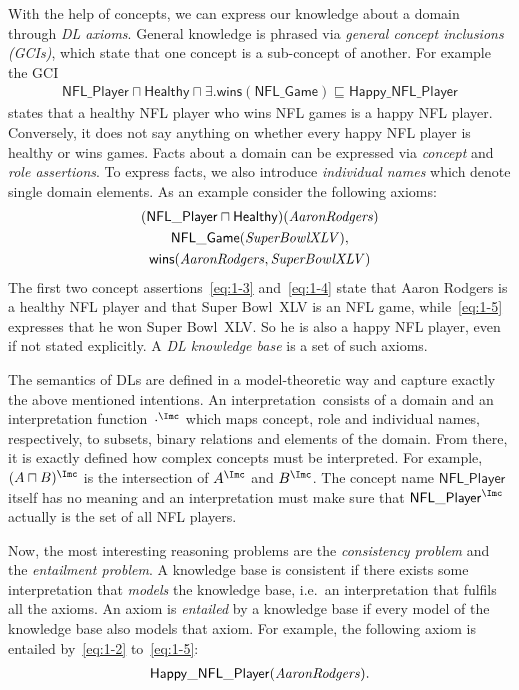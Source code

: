 \documentclass[final]{scrartcl}
\begin{document}
With the help of concepts, we can express our knowledge about a domain through \emph{DL
  axioms}. General knowledge is phrased via \emph{general concept inclusions (GCIs)}, which state
that one concept is a sub-concept of another. For example the GCI
\begin{align}
  \label{eq:1-2}
  \mathsf{NFL\_Player} \sqcap \mathsf{Healthy} \sqcap
  \exists.\mathsf{wins}(\mathsf{NFL\_Game}) \sqsubseteq \mathsf{Happy\_NFL\_Player}
\end{align}
states that a healthy NFL player who wins NFL games is a happy NFL player. Conversely, it does not say
anything on whether every happy NFL player is healthy or wins games. Facts about a domain can be
expressed via \emph{concept} and \emph{role assertions}.  To express facts, we also introduce
\emph{individual names} which denote single domain elements. As an example consider the following axioms:
\begin{gather}
  (\mathsf{NFL\_Player} \sqcap \mathsf{Healthy})(\text{\textit{AaronRodgers}})\label{eq:1-3}\\
  \mathsf{NFL\_Game}(\text{\textit{SuperBowlXLV}}),\label{eq:1-4}\\
  \mathsf{\mathsf{wins}}(\text{\textit{AaronRodgers}},\text{\textit{SuperBowlXLV}})\label{eq:1-5}
\end{gather}
The first two concept assertions~\eqref{eq:1-3} and~\eqref{eq:1-4} state that Aaron Rodgers is a healthy NFL player and that Super Bowl~XLV is
an NFL game, while~\eqref{eq:1-5} expresses that he won Super Bowl~XLV. So he is also a happy
NFL player, even if not stated explicitly.  A \emph{DL knowledge base} is a set of such axioms.

The semantics of DLs are defined in a model-theoretic way and capture exactly the above mentioned
intentions.  An interpretation~\I consists of a domain and an interpretation function~$\cdot^{\I}$
which maps concept, role and individual names, respectively, to subsets, binary relations and elements of the
domain.  From there, it is exactly defined how complex concepts must be
interpreted. For example, $(A\sqcap B)^{\I}$ is the intersection of $A^{\I}$ and $B^{\I}$.  The
concept name $\mathsf{NFL\_Player}$ itself has no meaning and an interpretation must make sure that
$\mathsf{NFL\_Player}^{\I}$ actually is the set of all NFL players.

Now, the most interesting reasoning problems are the \emph{consistency problem} and the \emph{entailment
problem}. A knowledge base is consistent if there exists some interpretation that \emph{models} the
knowledge base, i.e.\ an interpretation that fulfils all the axioms. An axiom is \emph{entailed} by
a knowledge base if every model of the knowledge base also models that axiom. For example, the following axiom is
entailed by~\eqref{eq:1-2} to~\eqref{eq:1-5}:
\begin{gather}
  \mathsf{Happy\_NFL\_Player}(\text{\textit{AaronRodgers}}).\label{eq:1-6}
\end{gather}
\end{document}
